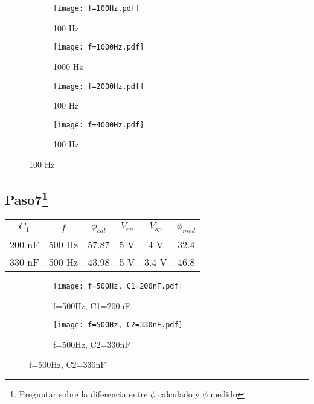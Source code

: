 \documentclass[a4paper,12pt]{article}
\begin{document}
\begin{figure}[H]
     \centering
     \begin{subfigure}[b]{0.3\textwidth}
         \centering
         \texttt{[image: f=100Hz.pdf]}
         \caption{100 Hz}
     \end{subfigure}
     \begin{subfigure}[b]{0.3\textwidth}
         \centering
         \texttt{[image: f=1000Hz.pdf]}
         \caption{1000 Hz}
     \end{subfigure}
          \centering
     \begin{subfigure}[b]{0.3\textwidth}
         \centering
         \texttt{[image: f=2000Hz.pdf]}
         \caption{100 Hz}
     \end{subfigure}
     \hfill
          \centering
     \begin{subfigure}[b]{0.3\textwidth}
         \centering
         \texttt{[image: f=4000Hz.pdf]}
         \caption{100 Hz}
     \end{subfigure}
\end{figure}








	
\subsection*{Paso7\footnote{Preguntar sobre la diferencia entre $\phi$ calculado y $\phi$ medido}}


\begin{center}
 \begin{tabular}{|c| c | c | c | c | c |} 
 \hline
 $C_1$ & $f$ & $\phi_{cal}$ & $ V_{ep} $ & $V_{sp}$ & $ \phi_{med} $ \\  
 \hline\hline
 200 nF & 500 Hz & 57.87 & 5 V & 4 V & 32.4  \\   
 \hline
 330 nF & 500 Hz & 43.98 &  5 V &  3.4 V & 46.8 \\  
 \hline 
\end{tabular}
\end{center}

\begin{figure}[H]
     \centering
     \begin{subfigure}[b]{0.3\textwidth}
         \centering
         \texttt{[image: f=500Hz, C1=200nF.pdf]}
         \caption{f=500Hz, C1=200nF	}
     \end{subfigure}
     \begin{subfigure}[b]{0.3\textwidth}
         \centering
         \texttt{[image: f=500Hz, C2=330nF.pdf]}
         \caption{f=500Hz, C2=330nF}
     \end{subfigure}
\end{figure}
\end{document}
